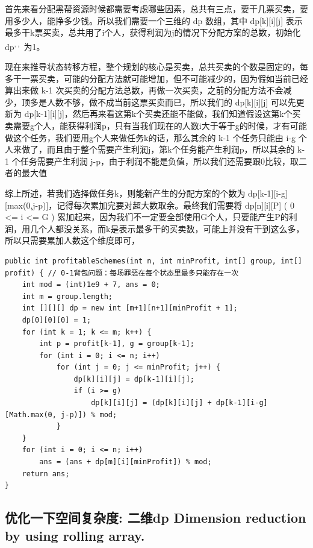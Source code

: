 \documentclass[9pt, b5paaper]{book}
\begin{document}
首先来看分配黑帮资源时候都需要考虑哪些因素，总共有三点，要干几票买卖，要用多少人，能挣多少钱。所以我们需要一个三维的 dp 数组，其中 dp[k][i][j] 表示最多干k票买卖，总共用了i个人，获得利润为j的情况下分配方案的总数，初始化 dp\footnotemark[2]{}\textsuperscript{,}\,\footnotemark[2]{}\textsuperscript{,}\,\footnotemark[2]{} 为1。

现在来推导状态转移方程，整个规划的核心是买卖，总共买卖的个数是固定的，每多干一票买卖，可能的分配方法就可能增加，但不可能减少的，因为假如当前已经算出来做 k-1 次买卖的分配方法总数，再做一次买卖，之前的分配方法不会减少，顶多是人数不够，做不成当前这票买卖而已，所以我们的 dp[k][i][j] 可以先更新为 dp[k-1][i][j]，然后再来看这第k个买卖还能不能做，我们知道假设这第k个买卖需要g个人，能获得利润p，只有当我们现在的人数i大于等于g的时候，才有可能做这个任务，我们要用g个人来做任务k的话，那么其余的 k-1 个任务只能由 i-g 个人来做了，而且由于整个需要产生利润j，第k个任务能产生利润p，所以其余的 k-1 个任务需要产生利润 j-p，由于利润不能是负值，所以我们还需要跟0比较，取二者的最大值

综上所述，若我们选择做任务k，则能新产生的分配方案的个数为 dp[k-1][i-g][max(0,j-p)]，记得每次累加完要对超大数取余。最终我们需要将 dp[n][i][P] ( 0 <= i <= G ) 累加起来，因为我们不一定要全部使用G个人，只要能产生P的利润，用几个人都没关系，而k是表示最多干的买卖数，可能上并没有干到这么多，所以只需要累加人数这个维度即可，

\begin{verbatim}
public int profitableSchemes(int n, int minProfit, int[] group, int[] profit) { // 0-1背包问题：每场罪恶在每个状态里最多只能存在一次
    int mod = (int)1e9 + 7, ans = 0;
    int m = group.length;
    int [][][] dp = new int [m+1][n+1][minProfit + 1]; 
    dp[0][0][0] = 1;
    for (int k = 1; k <= m; k++) {
        int p = profit[k-1], g = group[k-1];
        for (int i = 0; i <= n; i++) 
            for (int j = 0; j <= minProfit; j++) {
                dp[k][i][j] = dp[k-1][i][j];
                if (i >= g)
                    dp[k][i][j] = (dp[k][i][j] + dp[k-1][i-g][Math.max(0, j-p)]) % mod;
            }
    }
    for (int i = 0; i <= n; i++) 
        ans = (ans + dp[m][i][minProfit]) % mod;
    return ans;
}
\end{verbatim}
\subsection{优化一下空间复杂度: 二维dp Dimension reduction by using rolling array.}
\label{sec-2-26-2}
\end{document}
